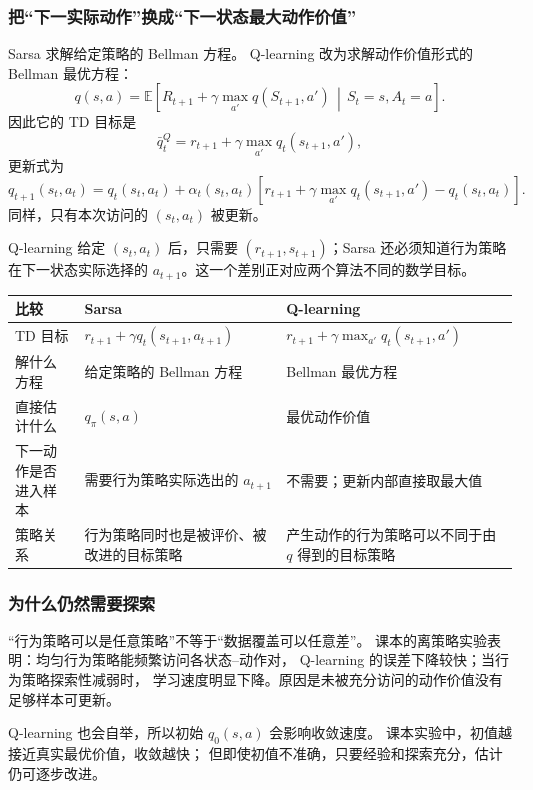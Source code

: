 \documentclass[11pt,a4paper,fontset=fandol]{ctexart}
\newcommand{\E}{\mathbb{E}}
\newcommand{\given}{\,\middle|\,}
\begin{document}
\subsubsection{把“下一实际动作”换成“下一状态最大动作价值”}

Sarsa 求解给定策略的 Bellman 方程。
Q-learning 改为求解动作价值形式的 Bellman 最优方程：
\[
\boxed{
q(s,a)
=
\E\!\left[
R_{t+1}
+\gamma\max_{a'}q(S_{t+1},a')
\given S_t=s,A_t=a
\right]}.
\]
因此它的 TD 目标是
\[
\bar q_t^{Q}
=
r_{t+1}
+\gamma\max_{a'}q_t(s_{t+1},a'),
\]
更新式为
\[
\boxed{
q_{t+1}(s_t,a_t)
=
q_t(s_t,a_t)
+\alpha_t(s_t,a_t)
\left[
r_{t+1}
+\gamma\max_{a'}q_t(s_{t+1},a')
-q_t(s_t,a_t)
\right]}.
\]
同样，只有本次访问的 \((s_t,a_t)\) 被更新。

Q-learning 给定 \((s_t,a_t)\) 后，只需要
\((r_{t+1},s_{t+1})\)；Sarsa 还必须知道行为策略在下一状态实际选择的
\(a_{t+1}\)。这一个差别正对应两个算法不同的数学目标。

\begin{center}
\begin{tabularx}{\textwidth}{
  >{\raggedright\arraybackslash}p{}
  >{\raggedright\arraybackslash}p{}
  X}
\toprule
比较 & Sarsa & Q-learning\\
\midrule
TD 目标 &
\(r_{t+1}+\gamma q_t(s_{t+1},a_{t+1})\) &
\(r_{t+1}+\gamma\max_{a'}q_t(s_{t+1},a')\)\\
解什么方程 &
给定策略的 Bellman 方程 &
Bellman 最优方程\\
直接估计什么 &
\(q_\pi(s,a)\) &
最优动作价值\\
下一动作是否进入样本 &
需要行为策略实际选出的 \(a_{t+1}\) &
不需要；更新内部直接取最大值\\
策略关系 &
行为策略同时也是被评价、被改进的目标策略 &
产生动作的行为策略可以不同于由 \(q\) 得到的目标策略\\
\bottomrule
\end{tabularx}
\end{center}

\subsubsection{为什么仍然需要探索}

“行为策略可以是任意策略”不等于“数据覆盖可以任意差”。
课本的离策略实验表明：均匀行为策略能频繁访问各状态--动作对，
Q-learning 的误差下降较快；当行为策略探索性减弱时，
学习速度明显下降。原因是未被充分访问的动作价值没有足够样本可更新。

Q-learning 也会自举，所以初始 \(q_0(s,a)\) 会影响收敛速度。
课本实验中，初值越接近真实最优价值，收敛越快；
但即使初值不准确，只要经验和探索充分，估计仍可逐步改进。
\end{document}
